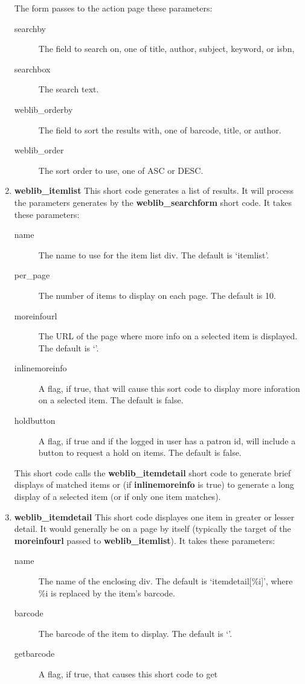 \documentclass[letterpaper,twoside]{article}
\begin{document}
\begin{enumerate}
The form passes to the action page these parameters:
\begin{description}
\item[searchby] The field to search on, one of title, author, subject,
keyword, or isbn,
\item[searchbox] The search text.
\item[weblib\_orderby] The field to sort the results with, one of
barcode, title, or author.
\item[weblib\_order] The sort order to use, one of ASC or DESC.
\end{description}
\item \textbf{weblib\_itemlist} This short code generates a list of
results. It will process the parameters generates by the
\textbf{weblib\_searchform} short code.  It takes these parameters:
  \begin{description}
  \item[name] The name to use for the item list div. The default is `itemlist'.
  \item[per\_page] The number of items to display on each page. The
default is 10.
  \item[moreinfourl] The URL of the page where more info on a selected
item is displayed. The default is `'. 
  \item[inlinemoreinfo] A flag, if true, that will cause this sort code
to display more inforation on a selected item. The default is false.
  \item[holdbutton] A flag, if true and if the logged in user has a
patron id, will include a button to request a hold on items. The
default is false.
  \end{description}
This short code calls the \textbf{weblib\_itemdetail} short code to
generate brief displays of matched items or (if \textbf{inlinemoreinfo}
is true) to generate a long display of a selected item (or if only one
item matches). 
\item \textbf{weblib\_itemdetail} This short code displayes one item in
greater or lesser detail. It would generally be on a page by itself
(typically the target of the \textbf{moreinfourl} passed to
\textbf{weblib\_itemlist}). It takes these parameters:
  \begin{description}
  \item[name] The name of the enclosing div.  The default is
`itemdetail[\%i]', where \%i is replaced by the item's barcode.
  \item[barcode] The barcode of the item to display. The default is `'.
  \item[getbarcode] A flag, if true, that causes this short code to get

\end{description}
\end{enumerate}
\end{document}
